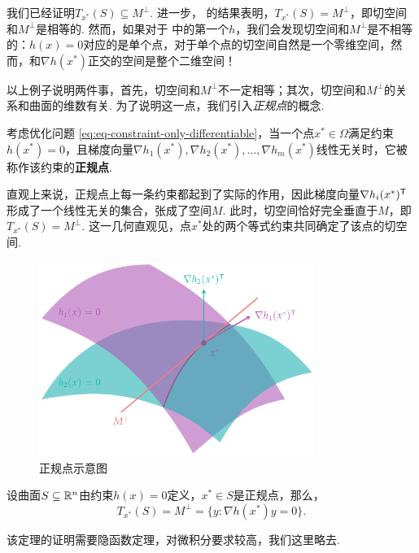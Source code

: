 我们已经证明$T_{x^*}(S)\subseteq M^\perp$. 进一步， 的结果表明，$T_{x^*}(S)=M^\perp$，即切空间和$M^\perp$是相等的. 然而，如果对于 中的第一个$h$，我们会发现切空间和$M^\perp$是不相等的：$h(x)=0$对应的是单个点，对于单个点的切空间自然是一个零维空间，然而，和$\nabla h(x^*)$正交的空间是整个二维空间！

以上例子说明两件事，首先，切空间和$M^\perp$不一定相等；其次，切空间和$M^\perp$的关系和曲面的维数有关. 为了说明这一点，我们引入\textit{正规点}的概念. 

\begin{definition}[正规点]\label{def:regular-point}
考虑优化问题 \eqref{eq:eq-constraint-only-differentiable}，当一个点$x^*\in\Omega$满足约束${h(x^*)}=0$，且梯度向量$\nabla h_1(x^*),\nabla h_2(x^*),\dots,\nabla h_m(x^*)$线性无关时，它被称作该约束的\textbf{正规点}. 
\end{definition}

直观上来说，正规点上每一条约束都起到了实际的作用，因此梯度向量$\nabla h_i(x^*)^{\mathsf{T}}$形成了一个线性无关的集合，张成了空间$M$. 此时，切空间恰好完全垂直于$M$，即$T_{x^*}(S)=M^\perp$. 这一几何直观见，点${x^* }$处的两个等式约束共同确定了该点的切空间.
\begin{figure}[ht]
    \centering
    \includegraphics[width=0.8\textwidth]{figures/duality/tan-2constraint.pdf}
    \caption{正规点示意图}
    \label{fig:tan-2constraint}
\end{figure}

\begin{theorem}[正规点切空间刻画定理]\label{thm:tan-space-characterize}
设曲面$S\subseteq\mathbb{R}^n$由约束$h(x)=0$定义，$x^*\in S$是正规点，那么，
\[T_{x^*}(S)=M^\perp=\{{y:\nabla h(x^*)y=0}\}.\]
\end{theorem}
该定理的证明需要隐函数定理，对微积分要求较高，我们这里略去.

